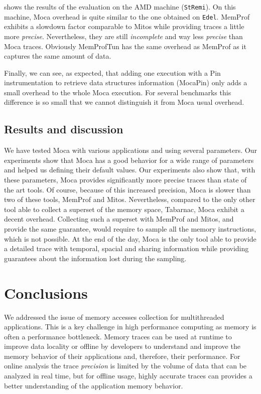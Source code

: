  shows the results of the evaluation on the AMD machine
(\texttt{StRemi}). On this machine, \gls{Moca} overhead is quite similar to the one
obtained on \texttt{Edel}.
\gls{MemProf} exhibits a slowdown factor comparable to \gls{Mitos} while
providing traces a little more \emph{precise}. Nevertheless, they are still \emph{incomplete} and
way less \emph{precise} than \gls{Moca} traces. Obviously MemProfTun has the same
overhead as \gls{MemProf} as it captures the same amount of data.

Finally, we can see, as expected, that adding one execution with a Pin instrumentation to retrieve data structures information (MocaPin) only adds a small overhead to the whole \gls{Moca} execution.
For several benchmarks this difference is so small that we cannot distinguish it from \gls{Moca} usual overhead.

\subsection{Results and discussion}

We have tested \gls{Moca} with various applications and using several parameters.
Our experiments show that \gls{Moca} has a good behavior for a wide range of parameters and helped us defining their default values.
Our experiments also show that, with these parameters, \gls{Moca} provides significantly more precise traces than state of the art tools.
Of course, because of this increased precision, \gls{Moca} is slower than two of these tools, \gls{MemProf} and \gls{Mitos}.
Nevertheless, compared to the only other tool able to collect a superset of the memory space, \gls{Tabarnac}, \gls{Moca} exhibit a decent overhead.
Collecting such a superset with \gls{MemProf} and \gls{Mitos}, and provide the same guarantee, would require to sample all the memory instructions, which is not possible.
At the end of the day, \gls{Moca} is the only tool able to provide a detailed trace with temporal, spacial and sharing information while providing guarantees about the information lost during the sampling.

\section{Conclusions}
\label{sec:moca-cncl}

We addressed the issue of memory accesses collection for multithreaded applications.
This is a key challenge in high performance computing as memory is often a performance bottleneck.
Memory traces can be used at runtime to improve data locality or offline by developers to understand and improve the memory behavior of their applications and, therefore, their performance.
For online analysis the trace \emph{precision} is limited by the volume of data that can be analyzed in real time, but for offline usage, highly accurate traces can provides a better understanding of the application memory behavior.

